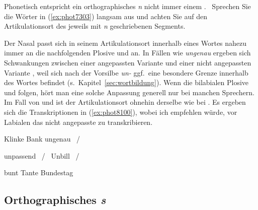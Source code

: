 Phonetisch entspricht ein orthographisches \textit{n} nicht immer einem \textipa{[n]}.
\TuBegin~Sprechen Sie die Wörter in (\ref{ex:phot7303}) langsam aus und achten Sie auf den Artikulationsort des jeweils mit \textit{n} geschriebenen Segments.

\begin{exe}
  \ex\label{ex:phot7303}
  \begin{xlist}
  \end{xlist}
\end{exe}

Der Nasal \textipa{[n]} passt sich in seinem Artikulationsort innerhalb eines Wortes nahezu immer an die nachfolgenden Plosive \textipa{[k]} und \textipa{[g]} an.
In Fällen wie \textit{ungenau} ergeben sich Schwankungen zwischen einer angepassten Variante \textipa{[PUNgen\t{aO}]} und einer nicht angepassten Variante \textipa{[PUngen\t{aO}]}, weil sich nach der Vorsilbe \textit{un-} ggf.\ eine besondere Grenze innerhalb des Wortes befindet (s.\ Kapitel~\ref{sec:wortbildung}).
Wenn die bilabialen Plosive \textipa{[p]} und \textipa{[b]} folgen, hört man eine solche Anpassung generell nur bei manchen Sprechern.
Im Fall von \textipa{[t]} und \textipa{[d]} ist der Artikulationsort ohnehin derselbe wie bei \textipa{[n]}.
Es ergeben sich die Transkriptionen in (\ref{ex:phot8100}), wobei ich empfehlen würde, vor Labialen das nicht angepasste \textipa{[n]} zu transkribieren.

\begin{exe}
    \ex\label{ex:phot8100}
    \begin{xlist}
      \ex Klinke \textipa{[klINk@]}
      \ex Bank \textipa{[baNk]}
      \ex ungenau \textipa{[PUng@n\t{aO}]}~\slash~\textipa{[PUNg@n\t{aO}]}
    \end{xlist}
    \ex\label{ex:phot8101}
    \begin{xlist}
      \ex unpassend \textipa{[PUmpas@nt]}~\slash~\textipa{[PUnpas@nt]}
      \ex Unbill \textipa{[PUmbIl]}~\slash~\textipa{[PUnbIl]}
    \end{xlist}
    \ex\label{ex:phot8102}
    \begin{xlist}
      \ex bunt \textipa{[bUnt]}
      \ex Tante \textipa{[tant@]}
      \ex Bundestag 
    \end{xlist}
\end{exe}

\subsection{Orthographisches \textit{s}}

